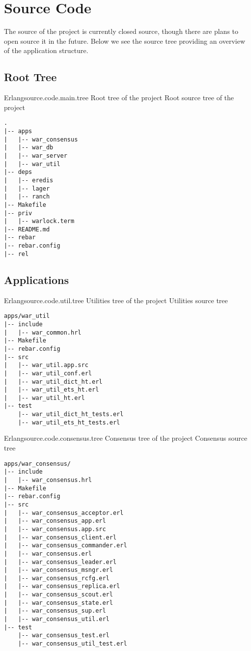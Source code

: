 ﻿\chapter{Source Code}
\label{appendix:source.code}

The source of the project is currently closed source, though there are plans
to open source it in the future. Below we see the source tree providing
an overview of the application structure.

\section{Root Tree}

\begin{scode}{Erlang}{source.code.main.tree}{%
  Root tree of the project}{%
  Root source tree of the project}
  \begin{lstlisting}
.
|-- apps
|   |-- war_consensus
|   |-- war_db
|   |-- war_server
|   |-- war_util
|-- deps
|   |-- eredis
|   |-- lager
|   |-- ranch
|-- Makefile
|-- priv
|   |-- warlock.term
|-- README.md
|-- rebar
|-- rebar.config
|-- rel

  \end{lstlisting}
\end{scode}

\section{Applications}

\begin{scode}{Erlang}{source.code.util.tree}{%
  Utilities tree of the project}{%
  Utilities source tree}
  \begin{lstlisting}
apps/war_util
|-- include
|   |-- war_common.hrl
|-- Makefile
|-- rebar.config
|-- src
|   |-- war_util.app.src
|   |-- war_util_conf.erl
|   |-- war_util_dict_ht.erl
|   |-- war_util_ets_ht.erl
|   |-- war_util_ht.erl
|-- test
    |-- war_util_dict_ht_tests.erl
    |-- war_util_ets_ht_tests.erl

  \end{lstlisting}
\end{scode}

\begin{scode}{Erlang}{source.code.consensus.tree}{%
  Consensus tree of the project}{%
  Consensus source tree}
  \begin{lstlisting}
apps/war_consensus/
|-- include
|   |-- war_consensus.hrl
|-- Makefile
|-- rebar.config
|-- src
|   |-- war_consensus_acceptor.erl
|   |-- war_consensus_app.erl
|   |-- war_consensus.app.src
|   |-- war_consensus_client.erl
|   |-- war_consensus_commander.erl
|   |-- war_consensus.erl
|   |-- war_consensus_leader.erl
|   |-- war_consensus_msngr.erl
|   |-- war_consensus_rcfg.erl
|   |-- war_consensus_replica.erl
|   |-- war_consensus_scout.erl
|   |-- war_consensus_state.erl
|   |-- war_consensus_sup.erl
|   |-- war_consensus_util.erl
|-- test
    |-- war_consensus_test.erl
    |-- war_consensus_util_test.erl
  \end{lstlisting}
\end{scode}

